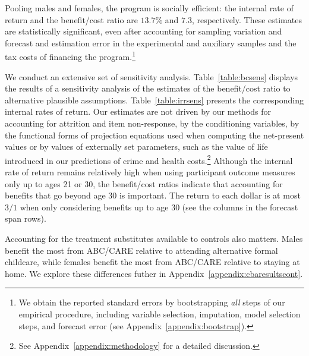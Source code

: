Pooling males and females, the program is socially efficient: the internal rate of return and the benefit/cost ratio are $13.7\%$ and $7.3$, respectively. These estimates are statistically significant, even after accounting for sampling variation and forecast and estimation error in the experimental and auxiliary samples and the tax costs of financing the program.\footnote{We obtain the reported standard errors by bootstrapping \emph{all} steps of our empirical procedure, including variable selection, imputation, model selection steps, and forecast error (see  Appendix~\ref{appendix:bootstrap}).}

We conduct an extensive set of sensitivity analysis. Table~\ref{table:bcsens} displays the results of a sensitivity analysis of the estimates of the benefit/cost ratio to alternative plausible assumptions. Table~\ref{table:irrsens} presents the corresponding internal rates of return. Our estimates are not driven by our methods for accounting for attrition and item non-response, by the conditioning variables, by the functional forms of projection equations used when computing the net-present values or by values of externally set parameters, such as the value of life introduced in our predictions of crime and health costs.\footnote{See Appendix~\ref{appendix:methodology} for a detailed discussion.} Although the internal rate of return remains relatively high when using participant outcome measures only up to ages 21 or 30, the benefit/cost ratios indicate that accounting for benefits that go beyond age 30 is important. The return to each dollar is at most $3/1$ when only considering benefits up to age 30 (see the columns in the forecast span rows).

Accounting for the treatment substitutes available to controls also matters. Males benefit the most from ABC/CARE relative to attending alternative formal childcare, while females benefit the most from ABC/CARE relative to staying at home. We explore these differences futher in Appendix~\ref{appendix:cbaresultscont}.

